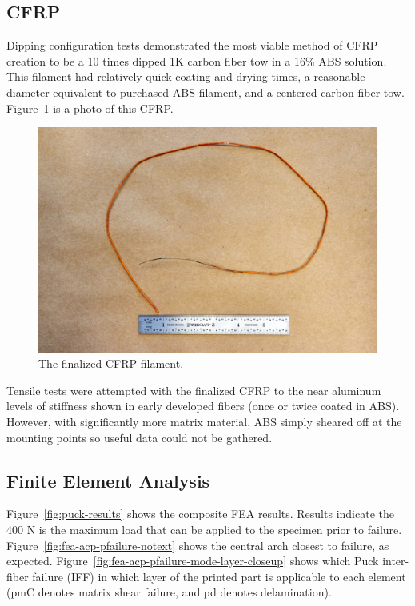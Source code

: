 
\subsection*{CFRP}

Dipping configuration tests demonstrated the most viable method of CFRP creation to be a 10 times dipped 1K carbon fiber tow in a 16\% ABS solution. This filament had relatively quick coating and drying times, a reasonable diameter equivalent to purchased ABS filament, and a centered carbon fiber tow. Figure~\ref{fig:filament-dipping-dried} is a photo of this CFRP.

\begin{figure}[t]
\centering
\includegraphics[width=0.8\linewidth]{./figures/filament-dipping-dried}
\caption{The finalized CFRP filament.}
\label{fig:filament-dipping-dried}
\end{figure}

Tensile tests were attempted with the finalized CFRP to the near aluminum levels of stiffness shown in early developed fibers (once or twice coated in ABS). However, with significantly more matrix material, ABS simply sheared off at the mounting points so useful data could not be gathered.

\subsection*{Finite Element Analysis}

Figure~\ref{fig:puck-results} shows the composite FEA results. Results indicate the 400 N is the maximum load that can be applied to the specimen prior to failure. Figure~\ref{fig:fea-acp-pfailure-notext} shows the central arch closest to failure, as expected. Figure~\ref{fig:fea-acp-pfailure-mode-layer-closeup} shows which Puck inter-fiber failure (IFF) in which layer of the printed part is applicable to each element (pmC denotes matrix shear failure, and pd denotes delamination).

